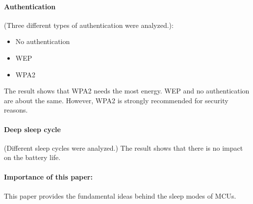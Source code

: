 \documentclass{report}
\begin{document}
\paragraph{Authentication} (Three different types of authentication were analyzed.):
\begin{itemize}
    \item No authentication
    \item WEP
    \item WPA2
\end{itemize}
The result shows that WPA2 needs the most energy. WEP and no authentication are about the same.
However, WPA2 is strongly recommended for security reasons.

\paragraph{Deep sleep cycle} (Different sleep cycles were analyzed.)
The result shows that there is no impact on the battery life.
\\\\
\textbf{Importance of this paper:}
\\\\
This paper provides the fundamental ideas behind the sleep modes of MCUs.




\end{document}
